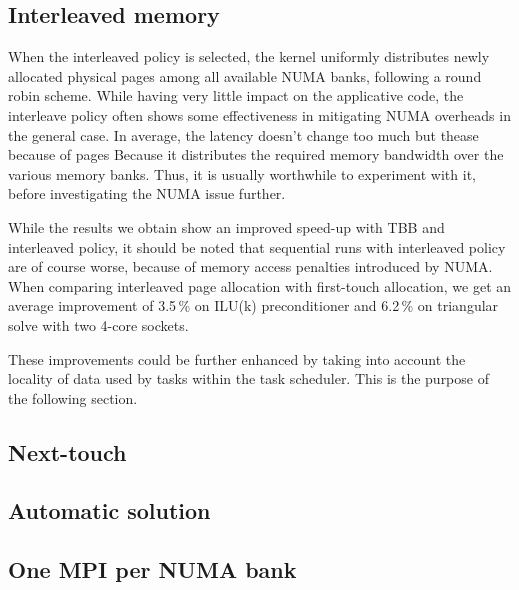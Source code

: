 \subsection{Interleaved memory}
When the interleaved policy is selected, the kernel uniformly distributes newly allocated physical pages among all available NUMA banks, following a round robin scheme.
%
While having very little impact on the applicative code, the interleave policy often shows some effectiveness in mitigating NUMA overheads in the general case.
%
In average, the latency doesn't change too much but thease because of pages Because it distributes the required memory bandwidth over the various memory banks.
%
Thus, it is usually worthwhile to experiment with it, before investigating the NUMA issue further.


While the results we obtain show an improved speed-up with TBB and interleaved policy,
it should be noted that sequential runs with interleaved policy are of
course worse, because of memory access penalties introduced by NUMA.
When comparing
interleaved page allocation with first-touch allocation, we get
an average improvement of 3.5\,\% on ILU(k) preconditioner
and 6.2\,\% on triangular solve with two 4-core sockets.

These improvements could be further enhanced by taking into account the locality of data
used by tasks within the task scheduler. This is the purpose of the
following section.



\subsection{Next-touch}
\subsection{Automatic solution}
\subsection{One MPI per NUMA bank}
